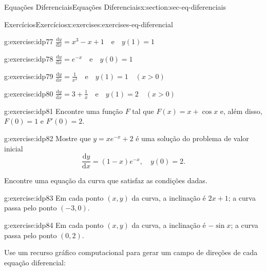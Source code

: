 \documentclass[oneside,10pt,]{article}
\numberwithin{equation}{section}
\newcommand{\dd}{\mathrm{d}}
\begin{document}
\begin{sectionptx}{Equações Diferenciais}{}{Equações Diferenciais}{}{}{x:section:sec-eq-diferenciais}
\begin{exercises-subsection}{Exercícios}{}{Exercícios}{}{}{x:exercises:exercises-eq-diferencial}
\begin{exercisegroup}
\begin{divisionexerciseeg}{3}{}{}{g:exercise:idp77}
\(\frac{\dd y}{\dd x}=x^3-x+1 \quad \text{e}\quad  y(1)=1\)\end{divisionexerciseeg}%
\begin{divisionexerciseeg}{4}{}{}{g:exercise:idp78}%
\(\frac{\dd y}{\dd x}=e^{-x} \quad \text{e}\quad  y(0)=1\)\end{divisionexerciseeg}%
\begin{divisionexerciseeg}{5}{}{}{g:exercise:idp79}%
\(\frac{\dd y}{\dd x}=\frac{1}{x^2}\quad  \text{e}\quad  y(1)=1\quad (x>0)\)\end{divisionexerciseeg}%
\begin{divisionexerciseeg}{6}{}{}{g:exercise:idp80}%
\(\frac{\dd y}{\dd x}=3 + \frac{1}{x}\quad  \text{e}\quad  y(1)=2\quad(x>0)\)\end{divisionexerciseeg}%
\end{exercisegroup}
\par\medskip\noindent
\begin{divisionexercise}{7}{}{}{g:exercise:idp81}%
Encontre uma função \(F\) tal que \(F(x) = x + \cos{x}\) e, além disso, \(F (0) = 1\) e \(F'(0) = 2\).%
\end{divisionexercise}%
\begin{divisionexercise}{8}{}{}{g:exercise:idp82}%
Mostre que \(y=xe^{-x} + 2\) é uma solução do problema de valor inicial%
%
\begin{equation*}
\frac{\dd y}{\dd x} = (1-x)e^{-x}, \quad y(0)=2.
\end{equation*}
\end{divisionexercise}%
\par\medskip\noindent%
%
Encontre uma equação da curva que satisfaz as condições dadas.%
\begin{exercisegroup}
\begin{divisionexerciseeg}{9}{}{}{g:exercise:idp83}%
Em cada ponto \((x, y)\) da curva, a inclinação é \(2x + 1\); a curva passa pelo ponto \((−3, 0)\).%
\end{divisionexerciseeg}%
\begin{divisionexerciseeg}{10}{}{}{g:exercise:idp84}%
Em cada ponto \((x, y)\) da curva, a inclinação é \(−\sin{x} \); a curva passa pelo ponto \((0, 2)\).%
\end{divisionexerciseeg}%
\end{exercisegroup}
\par\medskip\noindent
\par\medskip\noindent%
%
Use um recurso gráfico computacional para gerar um campo de direções de cada equação diferencial:%
\begin{exercisegroup}

\end{exercisegroup}
\end{exercises-subsection}
\end{sectionptx}
\end{document}
